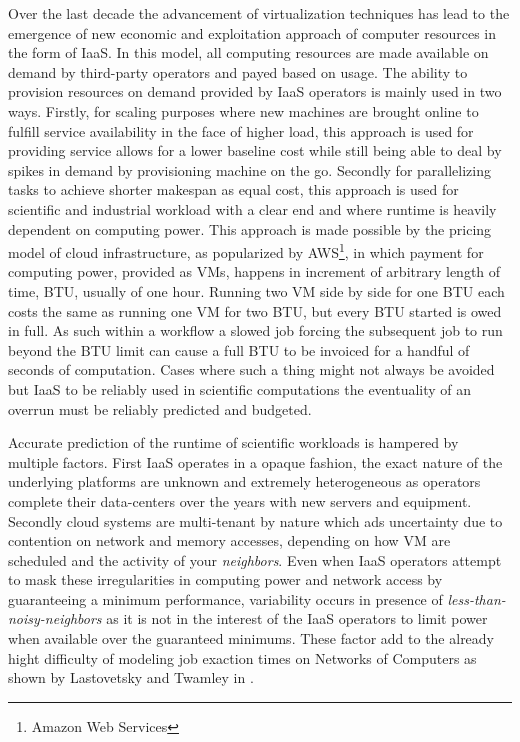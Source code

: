 \documentclass[10pt,conference,compsocconf]{IEEEtran}
\begin{document}
Over the  last decade the advancement  of virtualization techniques has  lead to
the emergence of new economic and exploitation approach of computer resources in
the form of \ac{IaaS}. In this model, all computing resources are made available
on demand  by third-party operators  and payed based  on usage.  The  ability to
provision resources on demand provided by  \ac{IaaS} operators is mainly used in
two ways.  Firstly,  for scaling purposes where new machines  are brought online
to fulfill  service availability in  the face of  higher load, this  approach is
used for  providing service allows for  a lower baseline cost  while still being
able to deal  by spikes in demand  by provisioning machine on  the go.  Secondly
for parallelizing tasks to achieve shorter makespan as equal cost, this approach
is  used for  scientific and  industrial  workload with  a clear  end and  where
runtime is heavily dependent on computing power.  This approach is made possible
by   the   pricing   model   of  cloud   infrastructure,   as   popularized   by
AWS\footnote{Amazon  Web  Services},  in  which  payment  for  computing  power,
provided  as  \acp{VM},  happens  in  increment of  arbitrary  length  of  time,
\ac{BTU}, usually of one hour. Running two \ac{VM} side by side for one \ac{BTU}
each costs  the same  as running  one \ac{VM}  for two  \ac{BTU}, but  every BTU
started is  owed in full.  As  such within a  workflow a slowed job  forcing the
subsequent job to run beyond the \ac{BTU}  limit can cause a full \ac{BTU} to be
invoiced for a handful of seconds of computation. Cases where such a thing might
not  always  be  avoided  but  \ac{IaaS}  to  be  reliably  used  in  scientific
computations  the eventuality  of  an  overrun must  be  reliably predicted  and
budgeted.

Accurate  prediction of  the  runtime  of scientific  workloads  is hampered  by
multiple factors. First \ac{IaaS} operates in a opaque fashion, the exact nature
of the underlying platforms are unknown and extremely heterogeneous as operators
complete   their   data-centers   over   the  years   with   new   servers   and
equipment.  Secondly  cloud  systems  are   multi-tenant  by  nature  which  ads
uncertainty due to  contention on network and memory accesses,  depending on how
\ac{VM}  are scheduled  and  the activity  of  your \emph{neighbors}.  Even when
\ac{IaaS} operators attempt to mask these irregularities in computing power and
network access by guaranteeing a minimum performance, variability occurs in
presence of \emph{less-than-noisy-neighbors} as it is not in the interest of the
\ac{IaaS} operators to limit power when available over the guaranteed minimums.
These factor add to the already hight difficulty of modeling job exaction times
on Networks of Computers as shown by Lastovetsky and Twamley in
\cite{Lastovetsky05}.
\end{document}
